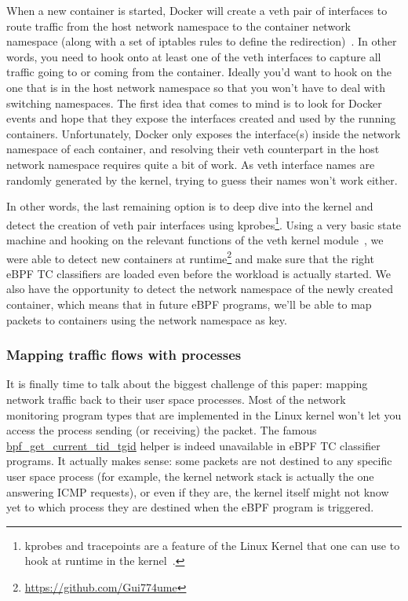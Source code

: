 When a new container is started, Docker will create a veth pair of interfaces to route traffic from the host network namespace to the container network namespace (along with a set of iptables rules to define the redirection)~\cite{ProcessLevelNetworkSecurityMonitoring:JonLangemak}. In other words, you need to hook onto at least one of the veth interfaces to capture all traffic going to or coming from the container. Ideally you’d want to hook on the one that is in the host network namespace so that you won’t have to deal with switching namespaces. The first idea that comes to mind is to look for Docker events and hope that they expose the interfaces created and used by the running containers. Unfortunately, Docker only exposes the interface(s) inside the network namespace of each container, and resolving their veth counterpart in the host network namespace requires quite a bit of work. As veth interface names are randomly generated by the kernel, trying to guess their names won’t work either.

In other words, the last remaining option is to deep dive into the kernel and detect the creation of veth pair interfaces using kprobes\footnote{kprobes and tracepoints are a feature of the Linux Kernel that one can use to hook at runtime in the kernel~\cite{ProcessLevelNetworkSecurityMonitoring:KernelProbesDoc}.}. Using a very basic state machine and hooking on the relevant functions of the veth kernel module~\cite{ProcessLevelNetworkSecurityMonitoring:GregKroahHartmanAlessandroRubiniJonathanCorbet}, we were able to detect new containers at runtime\footnote{\url{https://github.com/Gui774ume}} and make sure that the right eBPF TC classifiers are loaded even before the workload is actually started. We also have the opportunity to detect the network namespace of the newly created container, which means that in future eBPF programs, we’ll be able to map packets to containers using the network namespace as key.

\subsubsection{Mapping traffic flows with processes}

It is finally time to talk about the biggest challenge of this paper: mapping network traffic back to their user space processes. Most of the network monitoring program types that are implemented in the Linux kernel won’t let you access the process sending (or receiving) the packet. The famous \url{bpf_get_current_tid_tgid} helper is indeed unavailable in eBPF TC classifier programs. It actually makes sense: some packets are not destined to any specific user space process (for example, the kernel network stack is actually the one answering ICMP requests), or even if they are, the kernel itself might not know yet to which process they are destined when the eBPF program is triggered.

